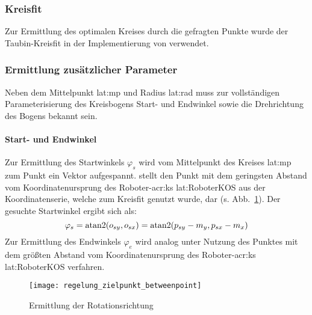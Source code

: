 \subsubsection{Kreisfit} 
Zur Ermittlung des optimalen Kreises durch die gefragten Punkte wurde der Taubin-Kreisfit \autocite{taubinEstimationPlanarCurves1991} in der Implementierung von \autocite{nikolaichernovMATLABCodesFitting2012} verwendet. 

\subsubsection{Ermittlung zusätzlicher Parameter}
Neben dem Mittelpunkt \gls{lat:mp} und Radius \gls{lat:rad} muss zur vollständigen Parameterisierung des Kreisbogens Start- und Endwinkel sowie die Drehrichtung des Bogens bekannt sein.

\paragraph{Start- und Endwinkel}
Zur Ermittlung des Startwinkels \( \varphi_s \) wird vom Mittelpunkt des Kreises \gls{lat:mp} zum Punkt  ein Vektor  aufgespannt.  stellt den Punkt mit dem geringsten Abstand vom Koordinatenursprung des Roboter-\gls{acr:ks} \gls{lat:RoboterKOS} aus der Koordinatenserie, welche zum Kreisfit genutzt wurde, dar (s. Abb.~\ref{fig:regelung:zielpunkt:betweenpoint}). Der gesuchte Startwinkel ergibt sich als:
\begin{equation}
\varphi_s =
\operatorname{atan2}(o_{sy}, o_{sx}) = 
\operatorname{atan2}(p_{sy}-m_{y}, p_{sx}-m_{x})
\end{equation}
Zur Ermittlung des Endwinkels \( \varphi_e \) wird analog unter Nutzung des Punktes mit dem größten Abstand vom Koordinatenursprung des Roboter-\gls{acr:ks} \gls{lat:RoboterKOS} verfahren.

\begin{figure}[htb]
  \centering
  \texttt{[image: regelung\_zielpunkt\_betweenpoint]}
  \caption{Ermittlung der Rotationsrichtung}
  \label{fig:regelung:zielpunkt:betweenpoint}
\end{figure}

